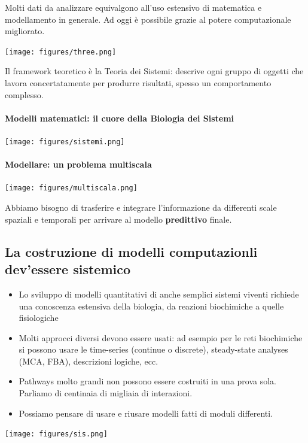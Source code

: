 \documentclass{article}
\begin{document}
Molti dati da analizzare equivalgono all'uso estensivo di matematica e modellamento in generale. Ad oggi è possibile grazie al potere computazionale migliorato.
\begin{center}
    \texttt{[image: figures/three.png]}
\end{center}
Il framework teoretico è la Teoria dei Sistemi: descrive ogni gruppo di oggetti che lavora concertatamente per produrre risultati, spesso un comportamento complesso.
\paragraph{Modelli matematici: il cuore della Biologia dei Sistemi}
\begin{center}
    \texttt{[image: figures/sistemi.png]}
\end{center}
\paragraph{Modellare: un problema multiscala}
\begin{center}
    \texttt{[image: figures/multiscala.png]}
\end{center}
Abbiamo bisogno di trasferire e integrare l'informazione da differenti scale spaziali e temporali per arrivare al modello \textbf{predittivo} finale.
\subsection{La costruzione di modelli computazionli dev'essere sistemico}
\begin{itemize}
    \item Lo sviluppo di modelli quantitativi di anche semplici sistemi viventi richiede una conoscenza estensiva della biologia, da reazioni biochimiche a quelle fisiologiche
    \item Molti approcci diversi devono essere usati: ad esempio per le reti biochimiche si possono usare le time-series (continue o discrete), steady-state
    analyses (MCA, FBA), descrizioni logiche, ecc.
    \item Pathways molto grandi non possono essere costruiti in una prova sola. Parliamo di centinaia di migliaia di interazioni.
    \item Possiamo pensare di usare e riusare modelli fatti di moduli differenti.
\end{itemize}
\begin{center}
    \texttt{[image: figures/sis.png]}
\end{center}
\end{document}

